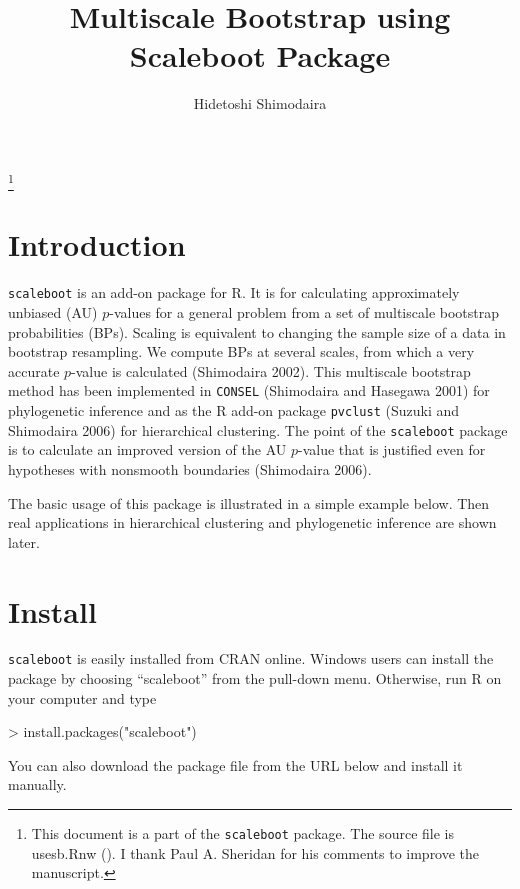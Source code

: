 \documentclass[a4paper]{amsart}
\begin{document}
\title{Multiscale Bootstrap using Scaleboot Package}
\author{Hidetoshi Shimodaira}
\thanks{This document is a part of the {\tt scaleboot} package.
The source file is usesb.Rnw (\documentid).
I thank Paul A. Sheridan for his comments to improve the manuscript.}
\address{Department of Mathematical and Computing Sciences\\
Tokyo Institute of Technology\\
2-12-1 Ookayama, Meguro-ku, Tokyo 152-8552, Japan}


\maketitle

\section{Introduction}

{\tt scaleboot} is an add-on package for R. It is for calculating
approximately unbiased (AU) $p$-values for a general problem from a set
of multiscale bootstrap probabilities (BPs). Scaling is equivalent to
changing the sample size of a data in bootstrap resampling. We
compute BPs at several scales, from which a very accurate $p$-value is
calculated (Shimodaira 2002). This multiscale bootstrap method has
been implemented in {\tt CONSEL} (Shimodaira and Hasegawa 2001) for
phylogenetic inference and as the R add-on package {\tt pvclust}
(Suzuki and Shimodaira 2006) for hierarchical clustering. The point of
the {\tt scaleboot} package is to calculate an improved version of the
AU $p$-value that is justified even for hypotheses with nonsmooth
boundaries (Shimodaira 2006).

The basic usage of this package is illustrated in a simple example
below.  Then real applications in hierarchical clustering and
phylogenetic inference are shown later.

\section{Install}

{\tt scaleboot} is easily installed from CRAN online.  Windows users
can install the package by choosing ``scaleboot'' from the pull-down
menu.  Otherwise, run R on your computer and type
\begin{Schunk}
\begin{Sinput}
> install.packages("scaleboot")
\end{Sinput}
\end{Schunk}
You can also download the package file from the URL below and
install it manually.
\end{document}

